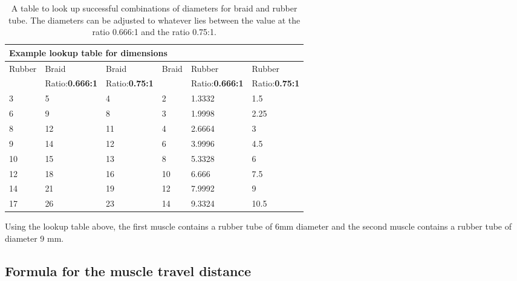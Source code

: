 \documentclass[main]{subfiles}
\begin{document}
\begin{table}[H]
\begin{tabular}{lllp{1cm}lll}
\toprule
\multicolumn{7}{l}{\textbf{Example lookup table for dimensions}} \\
\midrule
Rubber & Braid & \multicolumn{2}{l}{Braid}& Braid & Rubber & Rubber\\
{} & Ratio:\textbf{0.666:1} & \multicolumn{2}{l}{Ratio:\textbf{0.75:1}} & {} & Ratio:\textbf{0.666:1} & Ratio:\textbf{0.75:1}\\
\midrule
3 & 5 & 4 & {} & 2 & 1.3332 & 1.5 \\
6 & 9 & 8 & {} & 3 & 1.9998 & 2.25 \\
8 & 12 & 11 & {} & 4 & 2.6664 & 3 \\
9 & 14 & 12 & {}& 6 & 3.9996 & 4.5 \\
10 & 15 & 13 & {} & 8 & 5.3328 & 6 \\
12 & 18 & 16 & {} & 10 & 6.666 & 7.5 \\
14 & 21 & 19 & {} & 12 & 7.9992 & 9 \\
17 & 26 & 23 & {} & 14 & 9.3324 & 10.5 \\
\end{tabular}
\caption[Diameter ratios]{A table to look up successful combinations of diameters for braid and rubber tube. The diameters can be adjusted to whatever lies between the value at the ratio 0.666:1 and the ratio 0.75:1.}
\label{look-up-table}
\end{table}

Using the lookup table above, the first muscle contains a rubber tube of 6mm diameter and the second muscle contains a rubber tube of diameter 9 mm.



\subsection{Formula for the muscle travel distance}
\end{document}
